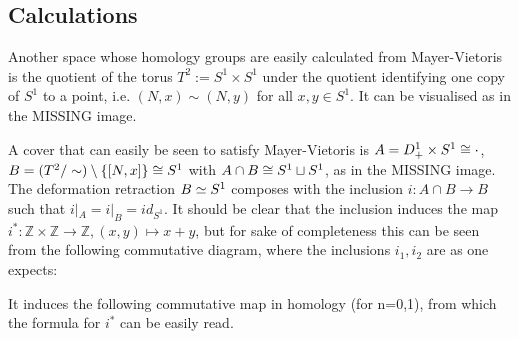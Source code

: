 \subsection{Calculations}

\begin{example}
Another space whose homology groups are easily calculated from Mayer-Vietoris is the quotient of the torus $T^2:= S^1 \times S^1$ under the quotient identifying one copy of $S^1$ to a point, i.e. $(N,x)\sim (N,y)$ for all $x,y \in S^1$. It can be visualised as in the MISSING image.

A cover that can easily be seen to satisfy Mayer-Vietoris is $A=D^1_+ \times S^1 \cong \cdot$, $B=(T^2/\sim) \setminus\{[N,x]\}\cong S^1$ with $A\cap B \cong S^1\sqcup S^1$, as in the MISSING image. The deformation retraction $B\simeq S^1$ composes with the inclusion $i:A\cap B\rightarrow B$ such that $i|_A=i|_B =id_{S^1}$. It should be clear that the inclusion induces the map $i^*:\mathbb{Z}\times \mathbb{Z}\rightarrow \mathbb{Z}, (x,y)\mapsto x+y$, but for sake of completeness this can be seen from the following commutative diagram, where the inclusions $i_1,i_2$ are as one expects:


It induces the following commutative map in homology (for n=0,1), from which the formula for $i^*$ can be easily read. 



\end{example}
